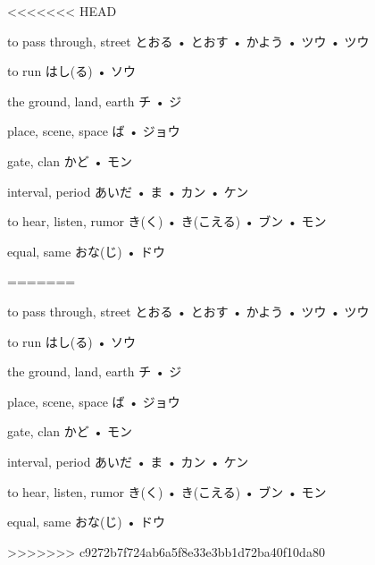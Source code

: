 <<<<<<< HEAD




\setcounter{cardnum}{49}

		{to pass through, street}
		{とおる • とおす • かよう • ツウ • ツウ}
		{}{}
		{}{}
		{}{}
		{}{}
		{}{}

		{to run}
		{はし(る) • ソウ}
		{}{}
		{}{}
		{}{}
		{}{}
		{}{}

		{the ground, land, earth}
		{チ • ジ}
		{}{}
		{}{}
		{}{}
		{}{}
		{}{}

		{place, scene, space}
		{ば • ジョウ}
		{}{}
		{}{}
		{}{}
		{}{}
		{}{}

		{gate, clan}
		{かど • モン}
		{}{}
		{}{}
		{}{}
		{}{}
		{}{}

		{interval, period}
		{あいだ • ま • カン • ケン}
		{}{}
		{}{}
		{}{}
		{}{}
		{}{}

		{to hear, listen, rumor}
		{き(く) • き(こえる) • ブン • モン}
		{}{}
		{}{}
		{}{}
		{}{}
		{}{}

		{equal, same}
		{おな(じ) • ドウ}
		{}{}
		{}{}
		{}{}
		{}{}
		{}{}

=======




\setcounter{cardnum}{49}

		{to pass through, street}
		{とおる • とおす • かよう • ツウ • ツウ}
		{}{}
		{}{}
		{}{}
		{}{}
		{}{}

		{to run}
		{はし(る) • ソウ}
		{}{}
		{}{}
		{}{}
		{}{}
		{}{}

		{the ground, land, earth}
		{チ • ジ}
		{}{}
		{}{}
		{}{}
		{}{}
		{}{}

		{place, scene, space}
		{ば • ジョウ}
		{}{}
		{}{}
		{}{}
		{}{}
		{}{}

		{gate, clan}
		{かど • モン}
		{}{}
		{}{}
		{}{}
		{}{}
		{}{}

		{interval, period}
		{あいだ • ま • カン • ケン}
		{}{}
		{}{}
		{}{}
		{}{}
		{}{}

		{to hear, listen, rumor}
		{き(く) • き(こえる) • ブン • モン}
		{}{}
		{}{}
		{}{}
		{}{}
		{}{}

		{equal, same}
		{おな(じ) • ドウ}
		{}{}
		{}{}
		{}{}
		{}{}
		{}{}

>>>>>>> c9272b7f724ab6a5f8e33e3bb1d72ba40f10da80
